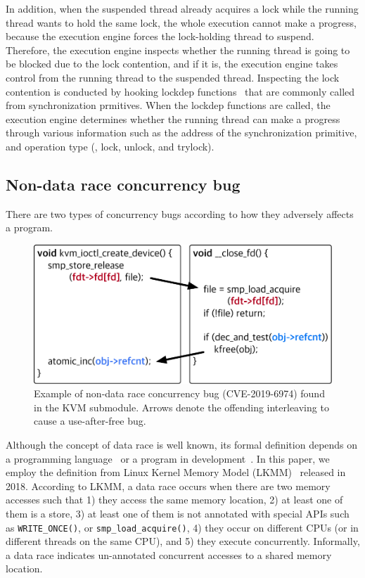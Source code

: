 In addition, when the suspended thread already acquires a lock while
the running thread wants to hold the same lock, the whole execution
cannot make a progress, because the execution engine forces the
lock-holding thread to suspend.
%
Therefore, the execution engine inspects whether the running thread is
going to be blocked due to the lock contention, and if it is, the
execution engine takes control from the running thread to the
suspended thread.
%
Inspecting the lock contention is conducted by hooking lockdep
functions~\cite{lockdep} that are commonly called from synchronization
prmitives.
%
When the lockdep functions are called, the execution engine determines
whether the running thread can make a progress through various
information such as the address of the synchronization primitive, and
operation type (\ie, lock, unlock, and trylock).

\subsection{Non-data race concurrency bug}
\label{s:appendix:datarace}

There are two types of concurrency bugs according to how they
adversely affects a program.

\begin{figure}
  \centering
  \includegraphics[width=0.85\linewidth]{fig/racecondition.pdf}
  \caption{Example of non-data race concurrency bug (CVE-2019-6974)
    found in the KVM submodule. Arrows denote the offending
    interleaving to cause a use-after-free bug.}
  \label{fig:concurrencybugs}
\end{figure}


%
Although the concept of data race is well known, its formal definition
depends on a programming language~\cite{C-standard-n2310,
  java-standard} or a program in development~\cite{lkmm}. In this
paper, we employ the definition from Linux Kernel Memory Model
(LKMM)~\cite{lkmm} released in 2018. According to LKMM, a data race
occurs when there are two memory accesses such that 1) they access the
same memory location, 2) at least one of them is a store, 3) at least
one of them is not annotated with special APIs such as
\texttt{WRITE_ONCE()}, or \texttt{smp_load_acquire()}, 4) they occur
on different CPUs (or in different threads on the same CPU), and 5)
they execute concurrently.
%
Informally, a data race indicates un-annotated concurrent accesses to
a shared memory location.


